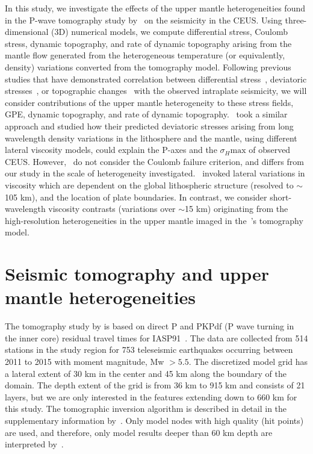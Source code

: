\documentclass[draft,linenumbers]{agujournal2018}
\begin{document}
In this study, we investigate the effects of the upper mantle heterogeneities found in the P-wave tomography study by~\citet{Biryol_2016} on the seismicity in the CEUS. Using three-dimensional (3D) numerical models, we compute differential stress, Coulomb stress, dynamic topography, and rate of dynamic topography arising from the mantle flow generated from the heterogeneous temperature (or equivalently, density) variations converted from the tomography model.  %
Following previous studies that have demonstrated correlation between differential stress~\citep[e.g.,][]{baird2010relationship, zhan2016stress},  deviatoric stresses~\citep[e.g.,][]{levandowski2016dense}, or topographic changes~\citep{becker2015western, ghosh2019role} with the observed intraplate seismicity, 
we will consider contributions of the upper mantle heterogeneity to these stress fields, GPE, dynamic topography, and rate of dynamic topography.~\citet{ghosh2019role} took a similar approach and studied how their predicted deviatoric stresses
arising from long wavelength density variations in the lithosphere and the mantle, using different lateral viscosity models, could explain the P-axes and the $\sigma_{H}\text{max}$ of observed CEUS. However,~\citet{ghosh2019role} do not consider the Coulomb failure criterion, and differs from our study in the scale of heterogeneity investigated.~\citet{ghosh2019role} invoked lateral variations in viscosity  which are dependent on the global lithospheric structure (resolved to $\sim$105 km), and the location of plate boundaries. In contrast, we consider short-wavelength viscosity contrasts (variations over $\sim$15 km) originating from the high-resolution heterogeneities in the upper mantle imaged in the~\citet{Biryol_2016}\rq{}s tomography model.


\section{Seismic tomography and upper mantle heterogeneities}

The tomography study by \citet{Biryol_2016} is based on direct P and PKPdf (P wave turning in the inner core) residual travel times for IASP91~\citep{kennett1991traveltimes}. The data are collected from 514 stations in the study region for 753 teleseismic earthquakes occurring between 2011 to 2015 with moment magnitude, Mw $> 5.5$. The discretized model grid has a lateral extent of 30 km in the center and 45 km along the boundary of the domain. The depth extent of the grid is from 36 km to 915 km and consists of 21 layers, but we are only interested in the features extending down to 660 km for this study. The tomographic inversion algorithm is described in detail in the supplementary information by~\citet{Biryol_2016}. Only model nodes with high quality (hit points) are used, and therefore, only model results deeper than 60 km depth are interpreted by~\citet{Biryol_2016}.
    
\end{document}
